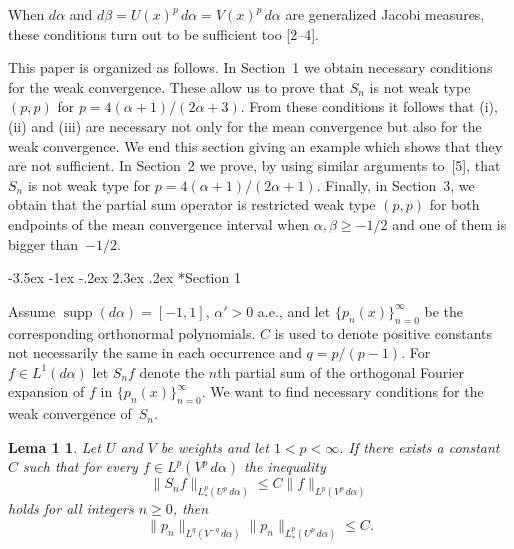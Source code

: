 \documentclass[10pt,a4paper]{article}
\makeatletter
\newcommand{\supp}{\operatorname{supp}}
\renewcommand\section{\@startsection {section}{1}{\z@}%
                                   {-3.5ex \@plus -1ex \@minus -.2ex}%
                                   {2.3ex \@plus.2ex}%
                                   {\centering \normalfont\large\scshape}}
\theoremstyle{plain}
\newtheorem*{lemmaOne}{Lema 1}
\theoremstyle{remark}
\makeatother
\begin{document}
When $d\alpha$ and $d\beta = U(x)^{p}\,d\alpha = V(x)^{p}\,d\alpha$
are generalized Jacobi measures, these conditions turn out to
be sufficient too [2--4].

This paper is organized as follows. In Section~1 we obtain necessary
conditions for the weak convergence. These allow us to prove
that $S_{n}$ is not weak type $(p,p)$ for $p = 4(\alpha+1)/(2\alpha+3)$.
From these conditions it follows that (i), (ii) and (iii) are necessary
not only for the mean convergence but also for the weak convergence.
We end this section giving an example which shows that they are
not sufficient. In Section~2 we prove, by using similar arguments
to~[5], that $S_{n}$ is not weak type for $p = 4(\alpha+1)/(2\alpha+1)$.
Finally, in Section~3, we obtain that the partial sum operator
is restricted weak type $(p,p)$ for both endpoints of the mean
convergence interval when $\alpha, \beta \geq -1/2$
and one of them is bigger than~$-1/2$.

\section*{Section 1}

Assume $\supp(d\alpha) = [-1,1]$, $\alpha' > 0$ a.e.,
and let $\{p_{n}(x)\}_{n=0}^{\infty}$ be the corresponding
orthonormal polynomials. $C$ is used to denote positive constants
not necessarily the same in each occurrence and $q = p/(p-1)$.
For $f \in L^{1}(d\alpha)$ let $S_{n}f$ denote the $n$th partial
sum of the orthogonal Fourier expansion of $f$
in $\{p_{n}(x)\}_{n=0}^{\infty}$.
We want to find necessary conditions for the weak convergence
of~$S_{n}$.

\begin{lemmaOne}
Let $U$ and $V$ be weights and let $1 < p < \infty$.
If there exists a constant $C$ such that for every
$f \in L^{p}(V^{p}\,d\alpha)$ the inequality
\begin{equation}
\|S_{n}f\|_{L^{p}_{*}(U^{p}\,d\alpha)}
\leq C\|f\|_{L^{p}(V^{p}\,d\alpha)}
\tag{1.1}
\end{equation}
holds for all integers $n \geq 0$, then
\begin{equation}
\|p_{n}\|_{L^{q}(V^{-q}\,d\alpha)}
\|p_{n}\|_{L^{p}_{*}(U^{p}\,d\alpha)} \leq C.
\tag{1.2}
\end{equation}
\end{lemmaOne}
\end{document}
